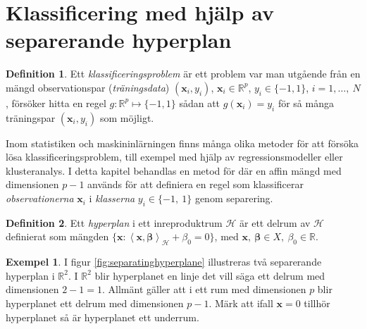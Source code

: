 \documentclass[a4paper, 12pt]{report}
\theoremstyle{definition}
\newtheorem{defi}{Definition}[section]
\newtheorem{ex}{Exempel}[section]
\theoremstyle{remark}
\newcommand{\bfbeta}{{\boldsymbol{\beta}}}
\newcommand{\bfx}{\mathbf{x}}
\newcommand{\llangle}{\left\langle}
\newcommand{\rrangle}{\right\rangle}
\newcommand{\inner}[2]{\llangle #1, #2 \rrangle}
\newcommand{\hil}{\mathcal{H}}
\begin{document}
\section{Klassificering med hjälp av separerande hyperplan}

\begin{defi}
	Ett \textit{klassificeringsproblem} är ett problem var man utgående från en mängd observationspar (\textit{träningsdata}) $\left(\mathbf{x}_i,y_i\right)$, $\mathbf{x}_i\in\mathbb{R}^p$, $y_i\in \{-1,1\}$, $i=1,\dots,~N$, försöker hitta en regel $g: \mathbb{R}^p \longmapsto \{-1,1\}$ sådan att $g\left(\mathbf{x}_i\right)=y_i$ för så många träningspar $\left(\mathbf{x}_i,y_i\right)$ som möjligt.
\end{defi}

Inom statistiken och maskininlärningen finns många olika metoder för att försöka lösa klassificeringsproblem, till exempel med hjälp av regressionsmodeller eller klusteranalys. I detta kapitel behandlas en metod för där en affin mängd med dimensionen $p-1$ används för att definiera en regel som klassificerar \textit{observationerna} $\mathbf{x}_i$ i \textit{klasserna} $y_i\in\{-1,~1\}$ genom separering.

\begin{defi}
	Ett \textit{hyperplan} i ett inreproduktrum $\mathcal{H}$ är ett delrum av $\mathcal{H}$ definierat som mängden $\{\mathbf{x}: \inner{\bfx}{\bfbeta}_\mathcal{H} + \beta_0=0\}$, med $\mathbf{x},~\bfbeta\in X,~\beta_0\in\mathbb{R}$.
\end{defi}

\begin{ex}
	I figur \ref{fig:separatinghyperplane} illustreras två separerande hyperplan i $\mathbb{R}^2$. I $\mathbb{R}^2$ blir hyperplanet en linje det vill säga ett delrum med dimensionen $2-1=1$.
	Allmänt gäller att i ett rum med dimensionen $p$ blir hyperplanet ett delrum med dimensionen $p-1$.
	Märk att ifall $\bfx = 0$ tillhör hyperplanet så är hyperplanet ett underrum.
\end{ex}
\end{document}
